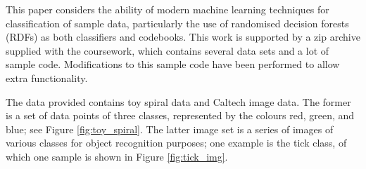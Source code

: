 \documentclass[a4paper, 10pt, conference]{ieeeconf}
\begin{document}

This paper considers the ability of modern machine learning techniques for classification of sample data, particularly the use of randomised decision forests (RDFs) as both classifiers and codebooks. This work is supported by a zip archive supplied with the coursework, which contains several data sets and a lot of sample code. Modifications to this sample code have been performed to allow extra functionality.

The data provided contains toy spiral data and Caltech image data. The former is a set of data points of three classes, represented by the colours red, green, and blue; see Figure \ref{fig:toy_spiral}. The latter image set is a series of images of various classes for object recognition purposes; one example is the tick class, of which one sample is shown in Figure \ref{fig:tick_img}.
\end{document}
